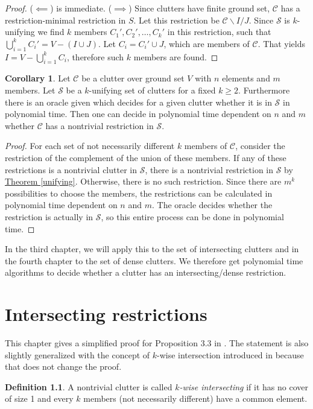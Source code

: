 \documentclass[a4paper, 12pt]{scrbook}
\theoremstyle{definition}
\newtheorem*{definition}{Definition}
\newtheorem{corollary}[theorem]{Corollary}
\begin{document}
   \begin{proof}
       ($\impliedby$) is immediate.
       ($\implies$) Since clutters have finite ground set, $\mathcal{C}$ has a restriction-minimal restriction in $S$.
       Let this restriction be $\mathcal{C}\backslash I / J$.
       Since $\mathcal{S}$ is $k$-unifying we find $k$ members $C_1', C_2', \ldots, C_k'$ in this restriction, such that $\bigcup_{i=1}^k C_i' = V - (I \cup J)$.
       Let $C_i = C_i' \cup J$, which are members of $\mathcal{C}$.
       That yields $I=V-\bigcup_{i=1}^k C_i$, therefore such $k$ members are found.
   \end{proof}
   \begin{corollary}
       Let $\mathcal{C}$ be a clutter over ground set $V$ with $n$ elements and $m$ members.
       Let $\mathcal{S}$ be a $k$-unifying set of clutters for a fixed $k\geq 2$.
       Furthermore there is an oracle given which decides for a given clutter whether it is in $\mathcal{S}$ in polynomial time.
       Then one can decide in polynomial time dependent on $n$ and $m$ whether $\mathcal{C}$ has a nontrivial restriction in $\mathcal{S}$.
   \end{corollary}

   \begin{proof}
       For each set of not necessarily different $k$ members of $\mathcal{C}$, consider the restriction of the complement of the union of these members.
       If any of these restrictions is a nontrivial clutter in $\mathcal{S}$, there is a nontrivial restriction in $\mathcal{S}$ by \hyperref[unifying]{Theorem \ref*{unifying}}.
       Otherwise, there is no such restriction.
       Since there are $m^k$ possibilities to choose the members, the restrictions can be calculated in polynomial time dependent on $n$ and $m$. The oracle decides whether the restriction is actually in $\mathcal{S}$, so this entire process can be done in polynomial time.
   \end{proof}

   In the third chapter, we will apply this to the set of intersecting clutters and in the fourth chapter to the set of dense clutters.
   We therefore get polynomial time algorithms to decide whether a clutter has an intersecting/dense restriction.

   \chapter{Intersecting restrictions}
   This chapter gives a simplified proof for Proposition 3.3 in \cite{restrictions}.
   The statement is also slightly generalized with the concept of $k$-wise intersection introduced in \cite{k-wise} because that does not change the proof.
   \begin{definition}
       A nontrivial clutter is called \emph{$k$-wise intersecting} if it has no cover of size 1 and every $k$ members (not necessarily different) have a common element.
   \end{definition}
\end{document}

